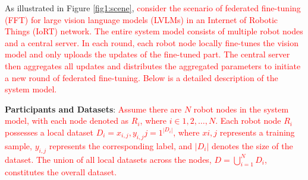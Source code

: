 \documentclass[lettersize,journal]{IEEEtran}
\begin{document}

As illustrated in Figure \ref{fig1:scene}, \textcolor{red}{consider the scenario of federated fine-tuning (FFT) for large vision language models (LVLMs) in an Internet of Robotic Things (IoRT) network. The entire system model consists of multiple robot nodes and a central server. In each round, each robot node locally fine-tunes the vision model and only uploads the updates of the fine-tuned part. The central server then aggregates all updates and distributes the aggregated parameters to initiate a new round of federated fine-tuning. Below is a detailed description of the system model.}


\textbf{Participants and Datasets}:
\textcolor{red}{Assume there are $N$ robot nodes in the system model, with each node denoted as $R_i$, where $i \in {1, 2, \ldots, N}$. Each robot node $R_i$ possesses a local dataset $D_i = {x_{i,j}, y_{i,j}}{j=1}^{|D_i|}$, where $x{i,j}$ represents a training sample, $y_{i,j}$ represents the corresponding label, and $|D_i|$ denotes the size of the dataset. The union of all local datasets across the nodes, $D = \bigcup_{i=1}^{N} D_i$, constitutes the overall dataset.}

\end{document}
